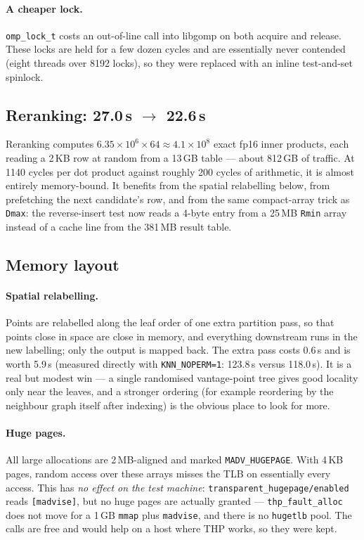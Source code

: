 \documentclass[11pt,a4paper]{article}
\newcommand{\code}[1]{\texttt{\small #1}}
\begin{document}
\paragraph{A cheaper lock.} \code{omp\_lock\_t} costs an out-of-line call into
libgomp on both acquire and release. These locks are held for a few dozen cycles
and are essentially never contended (eight threads over 8192 locks), so they were
replaced with an inline test-and-set spinlock.

\subsection{Reranking: 27.0\,s $\rightarrow$ 22.6\,s}

Reranking computes $6.35\times10^6 \times 64 \approx 4.1\times10^8$ exact fp16
inner products, each reading a 2\,KB row at random from a 13\,GB table --- about
812\,GB of traffic. At 1140 cycles per dot product against roughly 200 cycles of
arithmetic, it is almost entirely memory-bound. It benefits from the spatial
relabelling below, from prefetching the next candidate's row, and from the same
compact-array trick as \code{Dmax}: the reverse-insert test now reads a 4-byte
entry from a 25\,MB \code{Rmin} array instead of a cache line from the 381\,MB
result table.

\subsection{Memory layout}

\paragraph{Spatial relabelling.} Points are relabelled along the leaf order of
one extra partition pass, so that points close in space are close in memory, and
everything downstream runs in the new labelling; only the output is mapped back.
The extra pass costs 0.6\,s and is worth 5.9\,s (measured directly with
\code{KNN\_NOPERM=1}: 123.8\,s versus 118.0\,s). It is a real but modest win ---
a single randomised vantage-point tree gives good locality only near the leaves,
and a stronger ordering (for example reordering by the neighbour graph itself
after indexing) is the obvious place to look for more.

\paragraph{Huge pages.} All large allocations are 2\,MB-aligned and marked
\code{MADV\_HUGEPAGE}. With 4\,KB pages, random access over these arrays misses
the TLB on essentially every access. This has \emph{no effect on the test
machine}: \code{transparent\_hugepage/enabled} reads \code{[madvise]}, but no
huge pages are actually granted --- \code{thp\_fault\_alloc} does not move for a
1\,GB \code{mmap} plus \code{madvise}, and there is no \code{hugetlb} pool. The
calls are free and would help on a host where THP works, so they were kept.
\end{document}
